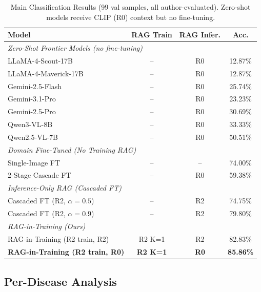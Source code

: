 \documentclass[conference,a4paper]{IEEEtran}
\begin{document}
\begin{table}[!ht]
\caption{Main Classification Results (99 val samples, all author-evaluated).
         Zero-shot models receive CLIP (R0) context but no fine-tuning.}
\label{tab:main}
\begin{center}
\setlength{\tabcolsep}{3pt}
\begin{tabular}{lccc}
\toprule
\textbf{Model} & \textbf{RAG Train} & \textbf{RAG Infer.} & \textbf{Acc.} \\
\midrule
\multicolumn{4}{l}{\textit{Zero-Shot Frontier Models (no fine-tuning)}} \\
LLaMA-4-Scout-17B             & --      & R0   & 12.87\% \\
LLaMA-4-Maverick-17B          & --      & R0   & 12.87\% \\
Gemini-2.5-Flash              & --      & R0   & 25.74\% \\
Gemini-3.1-Pro                & --      & R0   & 23.23\% \\
Gemini-2.5-Pro                & --      & R0   & 30.69\% \\
Qwen3-VL-8B                   & --      & R0   & 33.33\% \\
Qwen2.5-VL-7B~\cite{qwen2023} & --      & R0   & 50.51\% \\
\midrule
\multicolumn{4}{l}{\textit{Domain Fine-Tuned (No Training RAG)}} \\
Single-Image FT               & --      & --   & 74.00\% \\
2-Stage Cascade FT            & --      & R0   & 59.38\% \\
\midrule
\multicolumn{4}{l}{\textit{Inference-Only RAG (Cascaded FT)}} \\
Cascaded FT (R2, $\alpha{=}0.5$)       & --      & R2   & 74.75\% \\
Cascaded FT (R2, $\alpha{=}0.9$)       & --      & R2   & 79.80\% \\
\midrule
\multicolumn{4}{l}{\textit{RAG-in-Training (Ours)}} \\
RAG-in-Training (R2 train, R2) & R2 K=1 & R2   & 82.83\% \\
\textbf{RAG-in-Training (R2 train, R0)} & \textbf{R2 K=1} & \textbf{R0} & \textbf{85.86\%} \\
\bottomrule
\end{tabular}
\end{center}
\end{table}

\subsection{Per-Disease Analysis}
\end{document}
